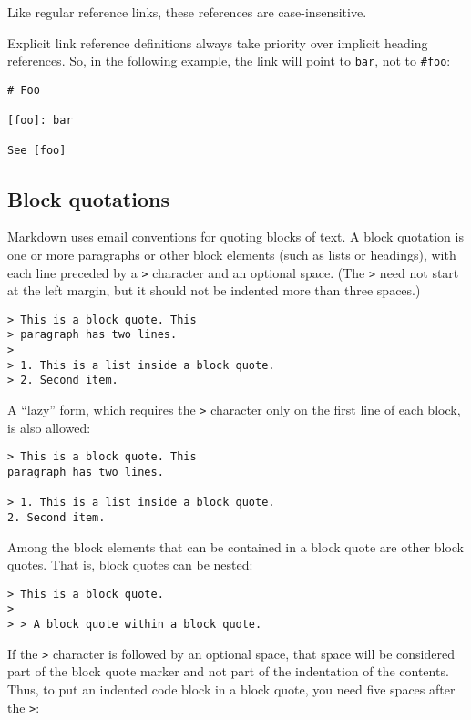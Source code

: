 \documentclass[]{article}
\begin{document}
Like regular reference links, these references are case-insensitive.

Explicit link reference definitions always take priority over implicit
heading references. So, in the following example, the link will point to
\texttt{bar}, not to \texttt{\#foo}:

\begin{verbatim}
# Foo

[foo]: bar

See [foo]
\end{verbatim}

\hypertarget{block-quotations}{%
\subsection{Block quotations}\label{block-quotations}}

Markdown uses email conventions for quoting blocks of text. A block
quotation is one or more paragraphs or other block elements (such as
lists or headings), with each line preceded by a \texttt{\textgreater{}}
character and an optional space. (The \texttt{\textgreater{}} need not
start at the left margin, but it should not be indented more than three
spaces.)

\begin{verbatim}
> This is a block quote. This
> paragraph has two lines.
>
> 1. This is a list inside a block quote.
> 2. Second item.
\end{verbatim}

A ``lazy'' form, which requires the \texttt{\textgreater{}} character
only on the first line of each block, is also allowed:

\begin{verbatim}
> This is a block quote. This
paragraph has two lines.

> 1. This is a list inside a block quote.
2. Second item.
\end{verbatim}

Among the block elements that can be contained in a block quote are
other block quotes. That is, block quotes can be nested:

\begin{verbatim}
> This is a block quote.
>
> > A block quote within a block quote.
\end{verbatim}

If the \texttt{\textgreater{}} character is followed by an optional
space, that space will be considered part of the block quote marker and
not part of the indentation of the contents. Thus, to put an indented
code block in a block quote, you need five spaces after the
\texttt{\textgreater{}}:
\end{document}

